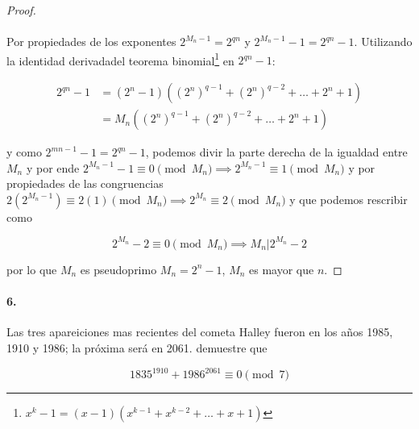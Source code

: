 \documentclass{article}
\begin{document}
\begin{proof}
		\paragraph{} Por propiedades de los exponentes $2^{M_n - 1} = 2^{qn}$ y $2^{M_n - 1} - 1 = 2^{qn} - 1$. Utilizando la identidad derivadadel teorema binomial\footnote{$x^k - 1 = (x-1)(x^{k-1} + x^{k-2} + \dots + x + 1)$} en $2^{qn} - 1$:
		
		\begin{align*}
		2^{qn} - 1 &= (2^n - 1)((2^n)^{q-1} + (2^n)^{q-2} + \dots + 2^n + 1)\\
		&= M_n((2^n)^{q-1} + (2^n)^{q-2} + \dots + 2^n + 1)
		\end{align*}
		
		y como $2^{mn -1} - 1 = 2^{qn} - 1$, podemos divir la parte derecha de la igualdad entre $M_n$ y por ende $2^{M_n - 1} - 1 \equiv 0 \pmod{M_n} \implies 2^{M_n - 1} \equiv 1 \pmod{M_n}$ y por propiedades de las congruencias $2(2^{M_n -1}) \equiv 2(1) \pmod{M_n} \implies 2^{M_n} \equiv 2 \pmod{M_n}$ y que podemos rescribir como
		
		$$2^{M_n} - 2 \equiv 0 \pmod{M_n} \implies M_n | 2^{M_n} - 2$$
		
		por lo que $M_n$ es pseudoprimo $M_n = 2^n - 1$, $M_n$ es mayor que $n$.
	\end{proof}
	
	\paragraph{6.} Las tres apareiciones mas recientes del cometa Halley fueron en los años 1985, 1910 y 1986; la próxima será en 2061. demuestre que
	
	$$1835^{1910} + 1986^{2061} \equiv 0 \pmod{7}$$
	
\end{document}
